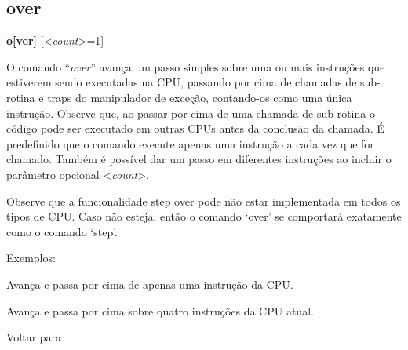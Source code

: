 \documentclass[letterpaper,10pt,brazil]{sphinxmanual}
\begin{document}
\subsection{over}
\label{debugger/execution:debugger-command-over}\label{debugger/execution:over}
\begin{DUlineblock}{0em}
\item[]
\begin{DUlineblock}{\DUlineblockindent}
\item[] \textbf{o{[}ver{]}} {[}\textless{}\emph{count}\textgreater{}=1{]}
\item[] 
\end{DUlineblock}
\item[] O comando ``\emph{over}'' avança um passo simples sobre uma ou mais instruções que estiverem sendo executadas na CPU, passando por cima de chamadas de sub-rotina e traps do manipulador de exceção, contando-os como uma única instrução. Observe que, ao passar por cima de uma chamada de sub-rotina o código pode ser executado em outras CPUs antes da conclusão da chamada. É predefinido que o comando execute apenas uma instrução a cada vez que for chamado. Também é possível dar um passo em diferentes instruções ao incluir o parâmetro opcional \textless{}\emph{count}\textgreater{}.
\item[] 
\item[] Observe que a funcionalidade step over pode não estar implementada em todos os tipos de CPU. Caso não esteja, então o comando `over' se comportará exatamente como o comando `step'.
\item[] 
\item[] Exemplos:
\item[] 
\item[]
\begin{DUlineblock}{\DUlineblockindent}
\item[] 
\item[] 
\end{DUlineblock}
\item[] Avança e passa por cima de apenas uma instrução da CPU.
\item[] 
\item[]
\begin{DUlineblock}{\DUlineblockindent}
\item[] 
\item[] 
\end{DUlineblock}
\item[] Avança e passa por cima sobre quatro instruções da CPU atual.
\item[] 
\item[] Voltar para {\hyperref[debugger/execution:debugger\string-execution\string-list]{}}
\end{DUlineblock}
\begin{quote}
\label{debugger/execution:debugger-command-out}\end{quote}
\end{document}
